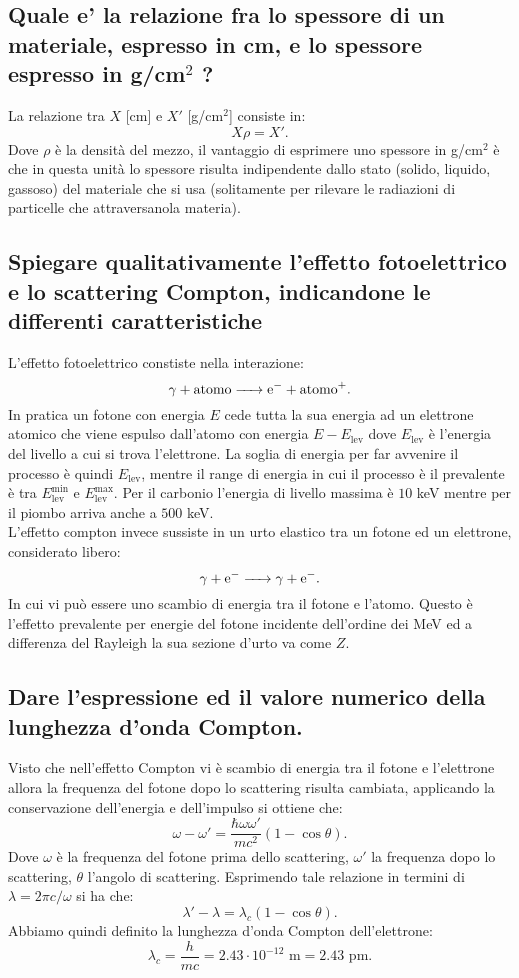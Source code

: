 \subsection[ Spessore di un materiale espresso in due modi]{Quale e' la relazione fra lo spessore di un materiale, espresso in cm, e lo spessore espresso in g/cm$^2$ ?
} \label{sec:4.a.1}
La relazione tra $X$ [cm] e $X'$ [g/cm$^2$] consiste in:
\[
	X\rho = X'
.\] 
Dove $\rho$ è la densità del mezzo, il vantaggio di esprimere uno spessore in g/cm$^2$ è che in questa unità lo spessore risulta indipendente dallo stato (solido, liquido, gassoso) del materiale che si usa (solitamente per rilevare le radiazioni di particelle che attraversanola materia).
\subsection[ Effetto fotoelettrico e scattering Compton]{Spiegare qualitativamente l’effetto fotoelettrico e lo scattering Compton, indicandone le differenti caratteristiche
}\label{sec:4.a.2}
L'effetto fotoelettrico constiste nella interazione:
\[
	\ce{\ce{\gamma} +  \text{atomo} -> \ce{e^-} + \text{atomo}+}
.\] 
In pratica un fotone con energia $E$ cede tutta la sua energia ad un elettrone atomico che viene espulso dall'atomo con energia $E-E_{\text{lev}}$ dove $E_{\text{lev}}$ è l'energia del livello a cui si trova l'elettrone. La soglia di energia per far avvenire il processo è quindi $E_{\text{lev}}$, mentre il range di energia in cui il processo è il prevalente è tra $E^{\text{min}}_{\text{lev}}$ e $E^{\text{max}}_{\text{lev}}$. Per il carbonio l'energia di livello massima è $10$ keV mentre per il piombo arriva anche a $500$ keV.\\
L'effetto compton invece sussiste in un urto elastico tra un fotone ed un elettrone, considerato libero:
\[
	\ce{\ce{\gamma} + e- -> \ce{\gamma} + e- }
.\] 
In cui vi può essere uno scambio di energia tra il fotone e l'atomo. Questo è l'effetto prevalente per energie del fotone incidente dell'ordine dei MeV ed a differenza del Rayleigh la sua sezione d'urto va come $Z$.
\subsection[ Lunghezza d'onda Compton]{Dare l'espressione ed il valore numerico della lunghezza d'onda Compton.
}\label{sec:4.a.3}
Visto che nell'effetto Compton vi è scambio di energia tra il fotone e l'elettrone allora la frequenza del fotone dopo lo scattering risulta cambiata, applicando la conservazione dell'energia e dell'impulso si ottiene che:
\[
	\omega-\omega'= \frac{\hbar \omega\omega'}{mc^2}\left( 1-\cos\theta \right) 
.\]
Dove $\omega$ è la frequenza del fotone prima dello scattering, $\omega'$ la frequenza dopo lo scattering, $\theta$ l'angolo di scattering.
Esprimendo tale relazione in termini di $\lambda= 2\pi c/ \omega$ si ha che:
\[
	\lambda'-\lambda= \lambda_{c}\left( 1-\cos\theta \right) 
.\] 
Abbiamo quindi definito la lunghezza d'onda Compton dell'elettrone:
\[
	\lambda_{c}=\frac{h}{mc} =2.43 \cdot 10^{-12} \text{ m} =  2.43 \text{ pm}
.\] 
